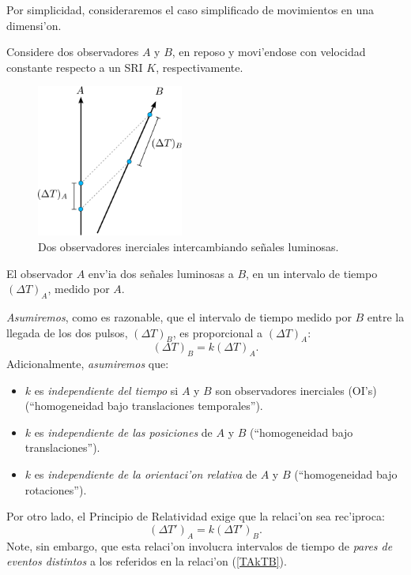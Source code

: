 Por simplicidad, consideraremos el caso simplificado de movimientos en
una dimensi'on.

Considere dos observadores $A$ y $B$, en reposo y movi'endose con
velocidad constante respecto a un SRI $K$, respectivamente.
\begin{figure}[H]
\centerline{\includegraphics[height=5cm]{fig/fig-diagrama-factor-k.pdf}}
 \caption{Dos observadores inerciales intercambiando se\~nales luminosas.}
\label{k1}
\end{figure}
El observador $A$ env'ia dos se\~nales luminosas a $B$, en un intervalo de tiempo $(\Delta T)_A$, medido por $A$.

\textit{Asumiremos}, como es razonable, que el intervalo de tiempo medido por $B$ entre la llegada
de los dos pulsos, $(\Delta T)_B$, es proporcional a $(\Delta T)_A$:
\begin{equation}
(\Delta T)_B=k (\Delta T)_A. \label{TAkTB}
\end{equation}
Adicionalmente, \textit{asumiremos} que:
\begin{itemize}
\item $k$ es \textit{independiente del tiempo} si $A$ y $B$ son observadores inerciales (OI's) (``homogeneidad bajo
translaciones temporales'').
\item $k$ es \textit{independiente de las posiciones} de $A$ y $B$ (``homogeneidad bajo translaciones'').
\item $k$ es \textit{independiente de la orientaci'on relativa} de $A$ y $B$ (``homogeneidad bajo rotaciones'').
\end{itemize}

Por otro lado, el Principio de Relatividad exige que la relaci'on sea rec'iproca:
\begin{equation}
(\Delta T')_A=k (\Delta T')_B .\label{tkt}
\end{equation}
Note, sin embargo, que esta relaci'on involucra intervalos de tiempo de \textit{pares de eventos distintos} a los referidos en la relaci'on (\ref{TAkTB}).

